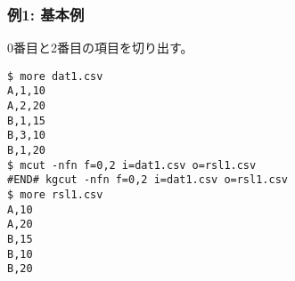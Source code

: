\subsubsection*{例1: 基本例}

0番目と2番目の項目を切り出す。


\begin{Verbatim}[baselinestretch=0.7,frame=single]
$ more dat1.csv
A,1,10
A,2,20
B,1,15
B,3,10
B,1,20
$ mcut -nfn f=0,2 i=dat1.csv o=rsl1.csv
#END# kgcut -nfn f=0,2 i=dat1.csv o=rsl1.csv
$ more rsl1.csv
A,10
A,20
B,15
B,10
B,20
\end{Verbatim}
